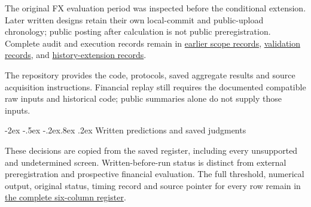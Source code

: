 \documentclass[10pt,a4paper]{article}
\makeatletter
\renewcommand\section{\@startsection{section}{1}{\z@}%
  {-2ex \@plus -.5ex \@minus -.2ex}{.8ex \@plus .2ex}%
  {\normalfont\large\bfseries}}
\makeatother
\begin{document}
The original FX evaluation period was inspected before the conditional extension. Later written designs retain their own local-commit and public-upload chronology; public posting after calculation is not public preregistration. Complete audit and execution records remain in \href{https://github.com/ByronLi0207/financial-mathematics-paper-20261020/blob/submission-final/EXTENDED_RESULTS.md#asmbi-extended-s36}{earlier scope records}, \href{https://github.com/ByronLi0207/financial-mathematics-paper-20261020/blob/submission-final/EXTENDED_RESULTS.md#asmbi-extended-s38}{validation records}, and \href{https://github.com/ByronLi0207/financial-mathematics-paper-20261020/blob/submission-final/EXTENDED_RESULTS.md#asmbi-extended-s39}{history-extension records}.

The repository provides the code, protocols, saved aggregate results and source acquisition instructions. Financial replay still requires the documented compatible raw inputs and historical code; public summaries alone do not supply those inputs.

\FloatBarrier


\section{Written predictions and saved judgments}\label{sup:submission-predictions}

These decisions are copied from the saved register, including every unsupported and undetermined screen. Written-before-run status is distinct from external preregistration and prospective financial evaluation. The full threshold, numerical output, original status, timing record and source pointer for every row remain in \href{https://github.com/ByronLi0207/financial-mathematics-paper-20261020/blob/submission-final/EXTENDED_RESULTS.md#asmbi-extended-s40}{the complete six-column register}.
\end{document}
